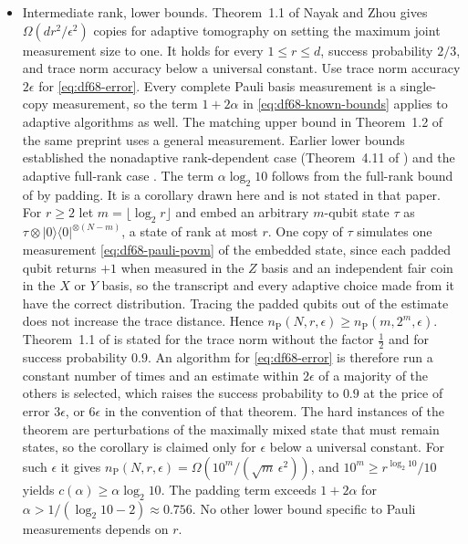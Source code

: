 \begin{itemize}
  \item Intermediate rank, lower bounds. Theorem~1.1 of Nayak and Zhou  gives $\Omega(dr^2/\epsilon^2)$ copies for adaptive tomography on setting the maximum joint measurement size to one. It holds for every $1\leq r\leq d$, success probability $2/3$, and trace norm accuracy below a universal constant. Use trace norm accuracy $2\epsilon$ for \eqref{eq:df68-error}. Every complete Pauli basis measurement is a single-copy measurement, so the term $1+2\alpha$ in \eqref{eq:df68-known-bounds} applies to adaptive algorithms as well. The matching upper bound in Theorem~1.2 of the same preprint uses a general measurement. Earlier lower bounds established the nonadaptive rank-dependent case (Theorem~4.11 of ) and the adaptive full-rank case . The term $\alpha\log_2 10$ follows from the full-rank bound of  by padding. It is a corollary drawn here and is not stated in that paper. For $r\geq2$ let $m=\lfloor\log_2 r\rfloor$ and embed an arbitrary $m$-qubit state $\tau$ as $\tau\otimes|0\rangle\langle0|^{\otimes(N-m)}$, a state of rank at most $r$. One copy of $\tau$ simulates one measurement \eqref{eq:df68-pauli-povm} of the embedded state, since each padded qubit returns $+1$ when measured in the $Z$ basis and an independent fair coin in the $X$ or $Y$ basis, so the transcript and every adaptive choice made from it have the correct distribution. Tracing the padded qubits out of the estimate does not increase the trace distance. Hence $n_{\mathrm{P}}(N,r,\epsilon)\geq n_{\mathrm{P}}(m,2^m,\epsilon)$. Theorem~1.1 of  is stated for the trace norm without the factor $\tfrac12$ and for success probability $0.9$. An algorithm for \eqref{eq:df68-error} is therefore run a constant number of times and an estimate within $2\epsilon$ of a majority of the others is selected, which raises the success probability to $0.9$ at the price of error $3\epsilon$, or $6\epsilon$ in the convention of that theorem. The hard instances of the theorem are perturbations of the maximally mixed state that must remain states, so the corollary is claimed only for $\epsilon$ below a universal constant. For such $\epsilon$ it gives $n_{\mathrm{P}}(N,r,\epsilon)=\Omega(10^m/(\sqrt m\,\epsilon^2))$, and $10^m\geq r^{\log_2 10}/10$ yields $c(\alpha)\geq\alpha\log_2 10$. The padding term exceeds $1+2\alpha$ for $\alpha>1/(\log_2 10-2)\approx0.756$. No other lower bound specific to Pauli measurements depends on $r$.


\end{itemize}

